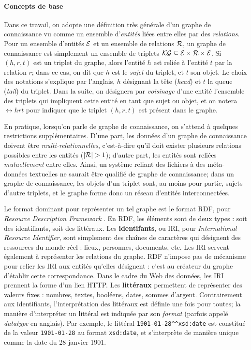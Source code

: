 \paragraph{Concepts de base}

Dans ce travail, on adopte une définition très générale d'un graphe de connaissance vu comme un ensemble d'\textit{entités} liées entre elles par des \textit{relations}. Pour un ensemble d'entités $\mathcal{E}$ et un ensemble de relations $\mathcal{R}$, un graphe de connaissance est simplement un ensemble de triplets $\mathcal{KG} \subseteq \mathcal{E} \times \mathcal{R} \times \mathcal{E}$. Si $(h, r, t)$ est un triplet du graphe, alors l'entité $h$ est reliée à l'entité $t$ par la relation $r$; dans ce cas, on dit que $h$ est le \textit{sujet} du triplet, et $t$ son objet. Le choix des notations s'explique par l'anglais, $h$ désignant la tête (\textit{head}) et $t$ la queue (\textit{tail}) du triplet. Dans la suite, on désignera par \textit{voisinage} d'une entité l'ensemble des triplets qui impliquent cette entité en tant que sujet ou objet, et on notera $\rel{h}{r}{t}$ pour indiquer que le triplet $(h, r, t)$ est présent dans le graphe.

En pratique, lorsqu'on parle de graphe de connaissance, on s'attend à quelques restrictions supplémentaires. D'une part, les données d'un graphe de connaissance doivent être \textit{multi-relationnelles}, c'est-à-dire qu'il doit exister plusieurs relations possibles entre les entités ($| \mathcal{R} | > 1$); d'autre part, les entités sont reliées \textit{mutuellement} entre elles. Ainsi, un système reliant des fichiers à des méta-données textuelles ne saurait être qualifié de graphe de connaissance; dans un graphe de connaissance, les objets d'un triplet sont, au moins pour partie, sujets d'autre triplets, et le graphe forme donc un réseau d'entités interconnectées. 


Le format dominant pour représenter un tel graphe est le format RDF, pour \textit{Resource Description Framework} \cite{cyganiak14}. En RDF, les éléments sont de deux types : soit des identifiants, soit des littéraux. Les \textbf{identifants}, ou IRI, pour \textit{International Resource Identifier}, sont simplement des chaînes de caractères qui désignent des ressources du monde réel : lieux, personnes, documents, etc. Les IRI servent également à représenter les relations du graphe.
RDF n'impose pas de mécanisme pour relier les IRI aux entités qu'elles désignent : c'est au créateur du graphe d'établir cette correspondance. Dans le cadre du Web des données, les IRI prennent la forme d'un lien HTTP.
Les \textbf{littéraux} permettent de représenter des valeurs fixes : nombres, textes, booléens, dates, sommes d'argent. Contrairement aux identifiants, l'interprétation des littéraux est définie une fois pour toutes; la manière d'interpréter un littéral est indiquée par son \textit{format} (parfois appelé \textit{datatype} en anglais). Par exemple, le littéral \texttt{1901-01-28\^{}\^{}xsd:date} est constitué de la valeur \texttt{1901-01-28} au format \texttt{xsd:date}, et s'interprète de manière unique comme la date du 28 janvier 1901.

